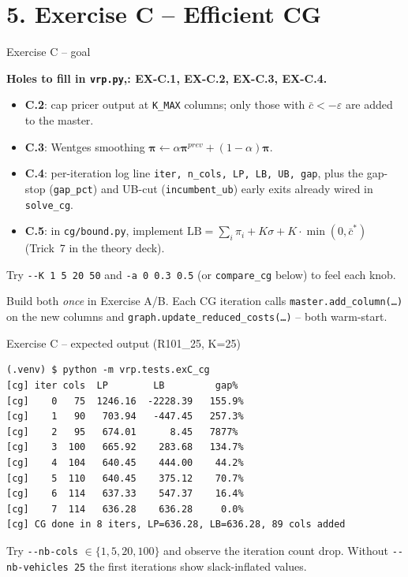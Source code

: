 \documentclass[10pt,aspectratio=169]{beamer}
\newcommand{\redcost}{\bar{c}}
\begin{document}
\section{5. Exercise C -- Efficient CG}

\begin{frame}{Exercise C -- goal}
  \begin{exbox}
    \textbf{Holes to fill in \texttt{vrp.py},: EX-C.1, EX-C.2, EX-C.3, EX-C.4.}
    \begin{itemize}\small
      \item \textbf{C.2}: cap pricer output at \texttt{K\_MAX} columns; only
            those with $\redcost<-\varepsilon$ are added to the master.
      \item \textbf{C.3}: Wentges smoothing
            $\boldsymbol\pi\!\leftarrow\!\alpha\boldsymbol\pi^{prev}
                                     +(1-\alpha)\boldsymbol\pi$.
      \item \textbf{C.4}: per-iteration log line
            \texttt{iter, n\_cols, LP, LB, UB, gap}, plus the gap-stop
            (\texttt{gap\_pct}) and UB-cut (\texttt{incumbent\_ub}) early
            exits already wired in \texttt{solve\_cg}.
      \item \textbf{C.5}: in \texttt{cg/bound.py}, implement
            $\text{LB}\!=\!\sum_i\pi_i + K\sigma + K\!\cdot\!\min(0,\redcost^*)$
            (Trick~7 in the theory deck).
    \end{itemize}
    Try \texttt{{-}{-}K 1\,5\,20\,50} and \texttt{-a 0\,0.3\,0.5}
    (or \texttt{compare\_cg} below) to feel each knob.
  \end{exbox}
  \begin{tipbox}
    Build both \emph{once} in Exercise A/B. Each CG iteration calls
    \texttt{master.add\_column(\dots)} on the new columns and
    \texttt{graph.update\_reduced\_costs(\dots)} -- both warm-start.
  \end{tipbox}
\end{frame}

\begin{frame}[fragile]{Exercise C -- expected output (R101\_25, K=25)}
\begin{lstlisting}[style=sh,basicstyle=\ttfamily\scriptsize]
(.venv) $ python -m vrp.tests.exC_cg
[cg] iter cols  LP        LB         gap%
[cg]    0   75  1246.16  -2228.39   155.9%
[cg]    1   90   703.94   -447.45   257.3%
[cg]    2   95   674.01      8.45   7877%
[cg]    3  100   665.92    283.68   134.7%
[cg]    4  104   640.45    444.00    44.2%
[cg]    5  110   640.45    375.12    70.7%
[cg]    6  114   637.33    547.37    16.4%
[cg]    7  114   636.28    636.28     0.0%
[cg] CG done in 8 iters, LP=636.28, LB=636.28, 89 cols added
\end{lstlisting}
  Try \texttt{{-}{-}nb-cols} $\in\!\{1,5,20,100\}$ and observe the iteration count drop.
  Without \texttt{{-}{-}nb-vehicles 25} the first iterations show slack-inflated values.
\end{frame}
\end{document}
